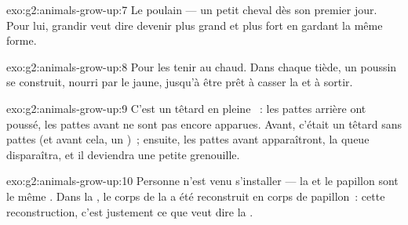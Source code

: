 \begin{solution}{exo:g2:animals-grow-up:7}
Le poulain --- un petit cheval dès son premier jour. Pour lui,
grandir veut dire devenir plus grand et plus fort en gardant la même
forme.
\end{solution}

\begin{solution}{exo:g2:animals-grow-up:8}
Pour les tenir au chaud. Dans chaque  tiède, un poussin se
construit, nourri par le jaune, jusqu'à être prêt à casser la
 et à sortir.
\end{solution}

\begin{solution}{exo:g2:animals-grow-up:9}
C'est un têtard en pleine ~: les pattes arrière ont
poussé, les pattes avant ne sont pas encore apparues. Avant, c'était
un têtard sans pattes (et avant cela, un )~; ensuite, les pattes
avant apparaîtront, la queue disparaîtra, et il deviendra une petite
grenouille.
\end{solution}

\begin{solution}{exo:g2:animals-grow-up:10}
Personne n'est venu s'installer --- la  et le papillon sont
le même . Dans la , le corps de la  a été
reconstruit en corps de papillon~: cette reconstruction, c'est
justement ce que veut dire la .
\end{solution}
